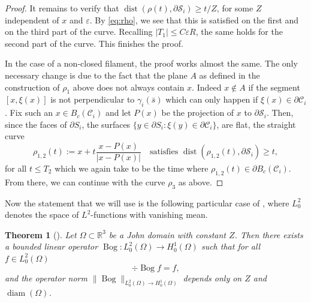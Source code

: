 \documentclass[10pt]{amsart}
\newcommand{\R}{\mathbb{R}}
\let\eps\varepsilon
\DeclareMathOperator{\Bog}{Bog}
\DeclareMathOperator{\diam}{diam}
\DeclareMathOperator{\dist}{dist}
\newtheorem{thm}{Theorem}[section]
\theoremstyle{definition}
\theoremstyle{remark}
\begin{document}
\begin{proof}
It remains to verify that $ \dist(\rho(t),\partial \mathcal S_i) \geq t/Z$, for some $Z$ independent of $x$ and $\eps$.
By \eqref{eq:rho}, we see that this is satisfied on the first and on the third part of the curve. Recalling $|T_1| \leq C \eps R$, the same holds for the second part of the curve. This finishes the proof.

In the case of a non-closed filament, the proof works almost the same. The only necessary change is due to the fact that the plane $A$ as defined in the construction of $\rho_1$ above does not always contain $x$. Indeed $x \not \in A$ if the segment $[x,\xi(x)]$ is not perpendicular to $\gamma_i (\bar s)$ which can only happen if $\xi (x) \in \partial \mathcal C_i$. Fix such an $x \in B_c(\mathcal C_i)$ and let $P(x)$ be the projection of $x$ to $\partial \mathcal S_i$. Then, since the faces of $\partial S_i$, \ie the surfaces $\{y \in \partial S_i : \xi(y) \in \partial \mathcal C_i\}$, are flat, the straight curve
\begin{equation}
\rho_{1,2}(t):= x + t \frac{x - P(x)}{|x - P(x)|}
\quad\text{satisfies }
\dist(\rho_{1,2}(t), \partial \mathcal S_i) \geq t,
\end{equation}
for all $t \leq T_2$ which we again take to be the time where $\rho_{1,2}(t) \in \partial B_c(\mathcal C_i)$. From there, we can continue with the curve $\rho_3$ as above.
\end{proof}

Now the statement that we will use is the following particular case of {\cite[Th.\,4.1]{AcostaDuranMuschietti06}}, where
$L^2_0$ denotes the space of $L^2$-functions with vanishing mean.
\begin{thm}[{\cite[Th.\,4.1]{AcostaDuranMuschietti06}}] \label{John}
Let $\Omega \subset \R^3$ be a John domain with constant $Z$. Then there exists a bounded linear operator
$\Bog \colon L^2_0(\Omega)\!\to\!H^{1}_0(\Omega)$
such that for all \hbox{$f \!\in\!L^2_0(\Omega)$}%
\begin{equation}
\div \Bog f = f,
\end{equation}
and the operator norm
$\|\Bog\|_{L^2_0(\Omega) \to H^{1}_0(\Omega)}$ depends only on $Z$ and $\diam(\Omega)$.
\end{thm}
\end{document}
